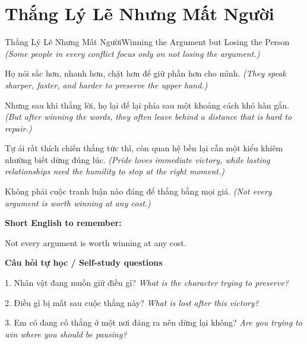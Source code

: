 \section{Thắng Lý Lẽ Nhưng Mất Người}
\begin{truyen}{Thắng Lý Lẽ Nhưng Mất Người}{Winning the Argument but Losing the Person}
\textit{(Some people in every conflict focus only on not losing the argument.)}

Họ nói sắc hơn, nhanh hơn, chặt hơn để giữ phần hơn cho mình.
\textit{(They speak sharper, faster, and harder to preserve the upper hand.)}

Nhưng sau khi thắng lời, họ lại để lại phía sau một khoảng cách khó hàn gắn.
\textit{(But after winning the words, they often leave behind a distance that is hard to repair.)}

Tự ái rất thích chiến thắng tức thì, còn quan hệ bền lại cần một kiểu khiêm nhường biết dừng đúng lúc.
\textit{(Pride loves immediate victory, while lasting relationships need the humility to stop at the right moment.)}

\end{truyen}

\begin{baihoc}
Không phải cuộc tranh luận nào đáng để thắng bằng mọi giá.
\textit{(Not every argument is worth winning at any cost.)}
\end{baihoc}

\begin{ghinhoanh}
\textbf{Short English to remember:}

Not every argument is worth winning at any cost.

\end{ghinhoanh}

\begin{tuhocnhanh}
\textbf{Câu hỏi tự học / Self-study questions}

1. Nhân vật đang muốn giữ điều gì? \textit{What is the character trying to preserve?}

2. Điều gì bị mất sau cuộc thắng này? \textit{What is lost after this victory?}

3. Em có đang cố thắng ở một nơi đáng ra nên dừng lại không? \textit{Are you trying to win where you should be pausing?}
\end{tuhocnhanh}
\ngancach

